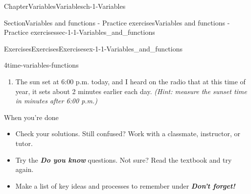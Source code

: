 \documentclass[twoside,11pt,]{book}
\newcommand{\alert}[1]{\textbf{\textit{#1}}}
\numberwithin{equation}{section}
\newcommand{\amp}{&}
\begin{document}
\begin{chapterptx}{Chapter}{Variables}{}{Variables}{}{}{ch-1-Variables}
\begin{sectionptx}{Section}{Variables and functions - Practice exercises}{}{Variables and functions - Practice exercises}{}{}{sec-1-1-Variables_and_functions}
\begin{exercises-subsection-numberless}{Exercises}{Exercises}{}{Exercises}{}{}{ex-1-1-Variables_and_functions}
\begin{divisionexercise}{4}{}{}{time-variables-functions}
\begin{enumerate}[label=(\alph*),ref=\alph*]
%
%
\item{}The sun set at 6:00 p.m. today, and I heard on the radio that at this time of year, it sets about 2 minutes earlier each day. \emph{(Hint: measure the sunset time in minutes after 6:00 p.m.)}%
\par
    \hspace{-2cm}
%
%
\end{enumerate}%
\end{divisionexercise}%
\end{exercises-subsection-numberless}
\begin{conclusion}{When you're done \textellipsis{}}%
%
\begin{itemize}[label=\textbullet]
\item{}Check your solutions. Still confused? Work with a classmate, instructor, or tutor.%
\item{}Try the \alert{Do you know} questions. Not sure? Read the textbook and try again.%
\item{}Make a list of key ideas and processes to remember under \alert{Don't forget!}%

\end{itemize}
\end{conclusion}
\end{sectionptx}
\end{chapterptx}
\end{document}
